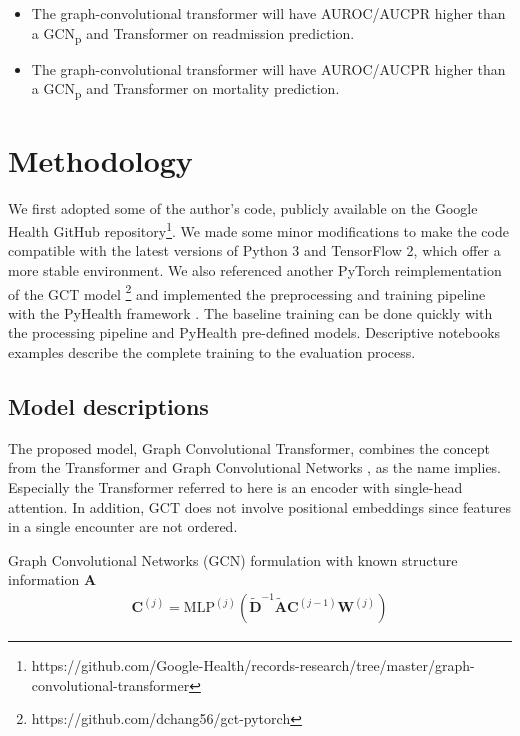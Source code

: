 \documentclass[11pt,a4paper]{article}
\begin{document}
\begin{itemize}
    \item The graph-convolutional transformer will have AUROC/AUCPR higher than a GCN\textsubscript{p} and Transformer on readmission prediction.
    \item The graph-convolutional transformer will have AUROC/AUCPR higher than a GCN\textsubscript{p} and Transformer on mortality prediction.
\end{itemize}

\section{Methodology}
We first adopted some of the author's code, publicly available on the Google Health GitHub repository\footnote{https://github.com/Google-Health/records-research/tree/master/graph-convolutional-transformer}. We made some minor modifications to make the code compatible with the latest versions of Python 3 and TensorFlow 2, which offer a more stable environment. We also referenced another PyTorch reimplementation of the GCT model \footnote{https://github.com/dchang56/gct-pytorch} and implemented the preprocessing and training pipeline with the PyHealth framework \citep{pyhealth2022github}. The baseline training can be done quickly with the processing pipeline and PyHealth pre-defined models. Descriptive notebooks examples describe the complete training to the evaluation process.

\subsection{Model descriptions}
The proposed model, Graph Convolutional Transformer, combines the concept from the Transformer \citep{DBLP:conf/nips/VaswaniSPUJGKP17} and Graph Convolutional Networks \citep{DBLP:journals/corr/KipfW16}, as the name implies. Especially the Transformer referred to here is an encoder with single-head attention. In addition, GCT does not involve positional embeddings since features in a single encounter are not ordered.

Graph Convolutional Networks (GCN) formulation with known structure information \textbf{A}
\begin{gather*}
    \textbf{C}^{(j)} = \text{MLP}^{(j)}\left(\tilde{\textbf{D}}^{-1} \tilde{\textbf{A}} \textbf{C}^{(j-1)}\textbf{W}^{(j)} \right)
\end{gather*}
\end{document}
